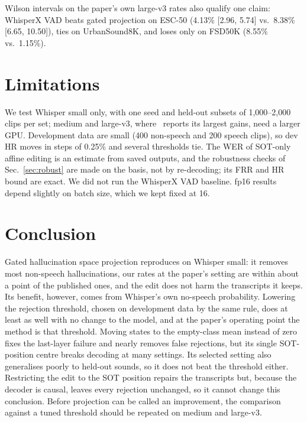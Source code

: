 \documentclass[conference,a4paper]{IEEEtran}
\begin{document}
Wilson intervals on the paper's own large-v3 rates also qualify one claim: WhisperX VAD beats gated projection on ESC-50 (4.13\% [2.96, 5.74] vs.\ 8.38\% [6.65, 10.50]), ties on UrbanSound8K, and loses only on FSD50K (8.55\% vs.\ 1.15\%).

\section{Limitations}

We test Whisper small only, with one seed and held-out subsets of 1,000--2,000 clips per set; medium and large-v3, where~\cite{abbasi2026hsp} reports its largest gains, need a larger GPU. Development data are small (400 non-speech and 200 speech clips), so dev HR moves in steps of 0.25\% and several thresholds tie. The WER of SOT-only affine editing is an estimate from saved outputs, and the robustness checks of Sec.~\ref{sec:robust} are made on the basis, not by re-decoding; its FRR and HR bound are exact. We did not run the WhisperX VAD baseline. fp16 results depend slightly on batch size, which we kept fixed at 16.

\section{Conclusion}

Gated hallucination space projection reproduces on Whisper small: it removes most non-speech hallucinations, our rates at the paper's setting are within about a point of the published ones, and the edit does not harm the transcripts it keeps. Its benefit, however, comes from Whisper's own no-speech probability. Lowering the rejection threshold, chosen on development data by the same rule, does at least as well with no change to the model, and at the paper's operating point the method is that threshold. Moving states to the empty-class mean instead of zero fixes the last-layer failure and nearly removes false rejections, but its single SOT-position centre breaks decoding at many settings. Its selected setting also generalises poorly to held-out sounds, so it does not beat the threshold either. Restricting the edit to the SOT position repairs the transcripts but, because the decoder is causal, leaves every rejection unchanged, so it cannot change this conclusion. Before projection can be called an improvement, the comparison against a tuned threshold should be repeated on medium and large-v3.
\end{document}
